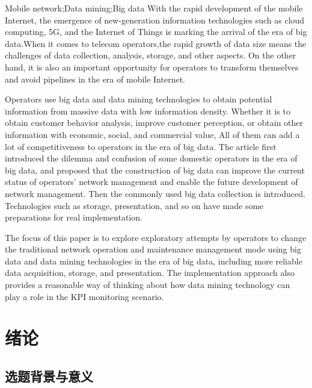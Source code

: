 \documentclass{HustGraduPaper}
\begin{document}
    \begin{enabstract}{Mobile network;Data mining;Big data}
        With the rapid development of the mobile Internet, the emergence of new-generation information technologies such as cloud computing, 
        5G, and the Internet of Things is marking the arrival of the era of big data.When it comes to telecom operators,the rapid growth of data size means the challenges of data collection,
        analysis, storage, and other aspects. On the other hand, it is also an important opportunity for operators to transform themselves and avoid pipelines in the era of mobile Internet.

        Operators use big data and data mining technologies to obtain potential information from massive data with low information density. 
        Whether it is to obtain customer behavior analysis, improve customer perception, or obtain other information with economic, 
        social, and commercial value, All of them can add a lot of competitiveness to operators in the era of big data. 
        The article first introduced the dilemma and confusion of some domestic operators in the era of big data, 
        and proposed that the construction of big data can improve the current status of operators' network management and enable the future development of network management. 
        Then the commonly used big data collection is introduced. Technologies such as storage, presentation, and so on have made some preparations for real implementation.

        The focus of this paper is to explore exploratory attempts by operators to change the traditional network operation and maintenance management mode using big data 
        and data mining technologies in the era of big data, including more reliable data acquisition, storage, and presentation. 
        The implementation approach also provides a reasonable way of thinking about how data mining technology can play a role in the KPI monitoring scenario.
    \end{enabstract}

    \tableofcontents
    \clearpage

    \section{绪论}
    
    \subsection{选题背景与意义}
\end{document}
